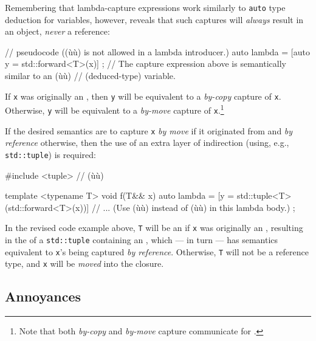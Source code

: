 Remembering that lambda-capture expressions work similarly to
\lstinline!auto! type deduction for variables, however,
reveals that such captures will \emph{always} result in an object, \emph{never} a reference:

\begin{emcppslisting}[emcppsignore={pseudocode}]
// pseudocode ((ù{}ù) is not allowed in a lambda introducer.)
auto lambda = [auto y = std::forward<T>(x)] { };
    // The capture expression above is semantically similar to an (ù{}ù)
    // (deduced-type) variable.
\end{emcppslisting}

\noindent If \lstinline!x! was originally an , then \lstinline!y! will be
equivalent to a \emph{by-copy} capture of \lstinline!x!. Otherwise,
\lstinline!y! will be equivalent to a \emph{by-move} capture of
\lstinline!x!.{\cprotect\footnote{Note that both \emph{by-copy} and
\emph{by-move} capture communicate  for
  .}}

If the desired semantics are to capture \lstinline!x! \emph{by move} if it
originated from  and \emph{by reference} otherwise, then
the use of an extra layer of indirection (using, e.g.,
\lstinline!std::tuple!) is required:

\begin{emcppslisting}[emcppsstandards={c++14}]
#include <tuple>  // (ù{}ù)

template <typename T>
void f(T&& x)
{
    auto lambda = [y = std::tuple<T>(std::forward<T>(x))]
    {
        // ... (Use (ù{}ù) instead of (ù{}ù) in this lambda body.)
    };
}
\end{emcppslisting}

\noindent In the revised code example above, \lstinline!T! will be an  if \lstinline!x! was originally an , resulting in
the  of a \lstinline!std::tuple! containing an
, which --- in turn --- has semantics
equivalent to \lstinline!x!'s being captured \emph{by reference}.
Otherwise, \lstinline!T! will not be a reference type, and \lstinline!x! will
be \emph{moved} into the closure.

\subsection[Annoyances]{Annoyances}\label{annoyances-lambdacapture}


